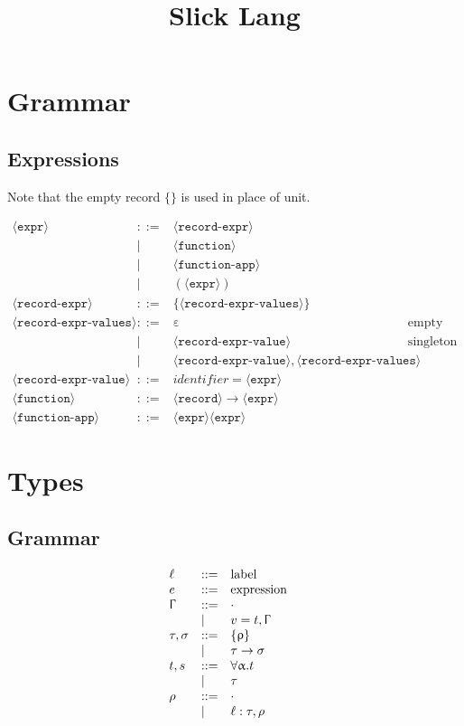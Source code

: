 \documentclass{article}
\title{Slick Lang}
\date{}
\author{}
\newcommand{\bnfvar}[1]{\langle \texttt{#1} \rangle}
\newcommand{\define}{::=}
\newcommand{\arrow}{\to}
\newcommand{\rcd}[1]{\{#1\}}
\newcommand{\emptyrow}{\cdot}
\newcommand{\ctx}{\Upgamma}
\begin{document}
\maketitle

\section{Grammar}

\subsection{Expressions}

Note that the empty record \(\{\}\) is used in place of unit.

\[
\begin{array}{lllrl}
  \bnfvar {expr} & \define & \bnfvar {record-expr} & \\
  & | & \bnfvar {function} & \\
  & | & \bnfvar {function-app} & \\
  & | & ( \bnfvar {expr} ) & \\
  \bnfvar {record-expr} & \define & \{ \bnfvar {record-expr-values} \} & \\
  \bnfvar {record-expr-values} & \define & \upepsilon & \text{empty} \\
  & | & \bnfvar {record-expr-value} & \text{singleton} \\
  & | & \bnfvar {record-expr-value} , \bnfvar {record-expr-values} & \\
  \bnfvar {record-expr-value} & \define & identifier = \bnfvar {expr} & \\
  \bnfvar {function} & \define & \bnfvar {record} \arrow \bnfvar {expr} & \\
  \bnfvar {function-app} & \define & \bnfvar {expr} \bnfvar {expr} & 
\end{array}
\]

\section{Types}

\subsection{Grammar}

\[
  \begin{array}{lllrl}
    \ell & \define & \text{label} & \\
    e & \define & \text{expression} & \\
    \ctx & \define & \cdot & \\
    & | & v = t, \ctx & \\
    \tau, \sigma & \define & \rcd \uprho &  \\
    & | & \tau \arrow \sigma & \\
    t, s & \define & \forall \upalpha. t & \\
    & | & \tau & \\
    \rho & \define & \emptyrow & \\
    & | & \ell : \tau, \rho &
  \end{array}
\]
\end{document}
